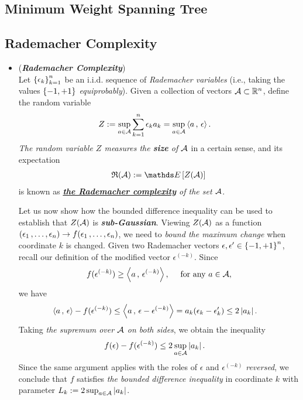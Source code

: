 \documentclass[11pt]{article}
\begin{document}
\subsection{Minimum Weight Spanning Tree}
\subsection{Rademacher Complexity}
\begin{itemize}
\item \begin{example} (\textbf{\emph{Rademacher Complexity}}) \citep{wainwright2019high}\\
Let $\left\{\epsilon_k\right\}^n_{k=1}$ be an i.i.d. sequence of \emph{Rademacher variables} (i.e., taking the values $\left\{-1, +1\right\}$ \emph{equiprobably}). Given a collection of vectors ${\mathcal A} \subset {\mathbb R}^n$, define the random variable
\begin{align}
Z &:= \sup_{a\in {\mathcal A}}\sum_{k=1}^{n}\epsilon_k a_k = \sup_{a \in {\mathcal A}}\left\langle a\,,\, \epsilon \right\rangle. \label{def: radematcher_complexity_1}
\end{align}
\emph{The random variable $Z$ measures the \textbf{size} of ${\mathcal A}$} in a certain sense, and its expectation 
\begin{align}
\frR(\cA) := \E{}{Z(\cA)} \label{def: radematcher_complexity_2}
\end{align} is known as \emph{\underline{\textbf{the Rademacher complexity}} of the set ${\mathcal A}$}.

Let us now show how the bounded difference inequality can be used to establish that $Z({\mathcal A})$ is \emph{\textbf{sub-Gaussian}}.
Viewing $Z({\mathcal A})$ as a function $(\epsilon_1 \,{,}\ldots{,}\, \epsilon_n) \to f(\epsilon_1 \,{,}\ldots{,}\, \epsilon_n)$, we need to \emph{bound the maximum change} when coordinate $k$ is changed. Given two Rademacher vectors $\epsilon, \epsilon' \in \left\{-1, +1\right\}^n$, recall our definition of the modified vector $\epsilon^{(-k)}$. Since 
\begin{align*}
f(\epsilon^{(-k)}) \ge \left\langle a\,,\, \epsilon^{(-k)} \right\rangle, \quad\text{ for any }a \in {\mathcal A},
\end{align*}
we have
\begin{align*}
\left\langle a\,,\, \epsilon \right\rangle - f(\epsilon^{(-k)}) &\le \left\langle a\,,\, \epsilon - \epsilon^{(-k)} \right\rangle = a_k(\epsilon_k - \epsilon_k') \le 2\left\lvert a_k \right\rvert.
\end{align*}
Taking \emph{the supremum over ${\mathcal A}$ on both sides}, we obtain the inequality
\begin{align*}
f(\epsilon) - f(\epsilon^{(-k)}) &\le 2 \sup_{a \in {\mathcal A}}\left\lvert a_k \right\rvert.
\end{align*} Since the same argument applies with the roles of $\epsilon$ and $\epsilon^{(-k)}$ \emph{reversed}, we conclude that $f$ satisfies \emph{the bounded difference inequality} in coordinate $k$ with parameter $L_k := 2 \sup_{a \in {\mathcal A}}\left\lvert a_k \right\rvert$. 


\end{example}
\end{itemize}
\end{document}
